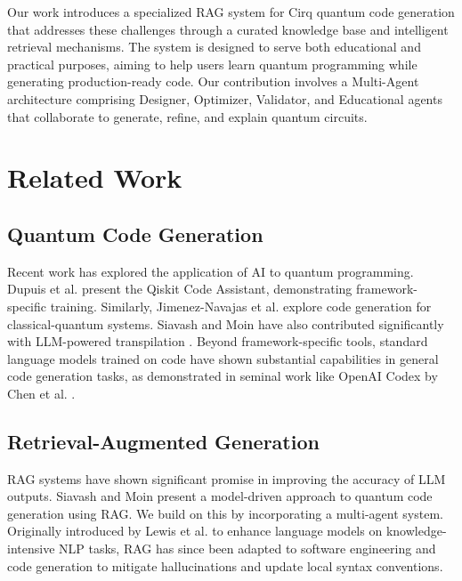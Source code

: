 \documentclass[runningheads]{llncs}
\begin{document}
Our work introduces a specialized RAG system for Cirq quantum code generation that addresses these challenges through a curated knowledge base and intelligent retrieval mechanisms. The system is designed to serve both educational and practical purposes, aiming to help users learn quantum programming while generating production-ready code. Our contribution involves a Multi-Agent architecture comprising Designer, Optimizer, Validator, and Educational agents that collaborate to generate, refine, and explain quantum circuits.

\section{Related Work}

\subsection{Quantum Code Generation}
Recent work has explored the application of AI to quantum programming. Dupuis et al. \cite{10691762} present the Qiskit Code Assistant, demonstrating framework-specific training. Similarly, Jimenez-Navajas et al. \cite{jimenez2025codegeneration} explore code generation for classical-quantum systems. Siavash and Moin have also contributed significantly with LLM-powered transpilation \cite{siavash2025llmpoweredquantumcodetranspilation}. Beyond framework-specific tools, standard language models trained on code have shown substantial capabilities in general code generation tasks, as demonstrated in seminal work like OpenAI Codex by Chen et al. \cite{chen2021evaluating}.

\subsection{Retrieval-Augmented Generation}
RAG systems have shown significant promise in improving the accuracy of LLM outputs. Siavash and Moin \cite{siavash2025modeldrivenquantumcodegeneration} present a model-driven approach to quantum code generation using RAG. We build on this by incorporating a multi-agent system. Originally introduced by Lewis et al. \cite{lewis2020retrieval} to enhance language models on knowledge-intensive NLP tasks, RAG has since been adapted to software engineering and code generation to mitigate hallucinations and update local syntax conventions.
\end{document}
